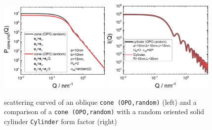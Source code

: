\begin{figure}[htb]
\includegraphics[width=0.481\textwidth]{../images/form_factor/oriented_primitive_opbjects/coneOPOoblique.png} \hfill
\includegraphics[width=0.481\textwidth]{../images/form_factor/oriented_primitive_opbjects/coneOPOcompare.png}
\caption{scattering curved of an oblique \texttt{cone (OPO,random)} (left) and a comparison of a \texttt{cone (OPO,random)} with a random oriented solid cylinder \texttt{Cylinder} form factor (right)}
\label{fig:opo_coneIQrandom}
\end{figure}

